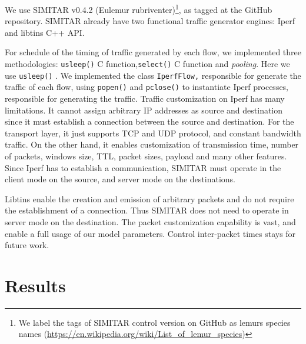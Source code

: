 We use SIMITAR v0.4.2 (Eulemur rubriventer)\footnote{ We label the tags of SIMITAR control version on GitHub as lemurs species names (\href{https://en.wikipedia.org/wiki/List_of_lemur_species}{https://en.wikipedia.org/wiki/List\_of\_lemur\_species})}, as tagged at the GitHub repository.  SIMITAR already have two functional traffic generator engines: Iperf and libtins C++ API.  

For schedule of the timing of traffic generated by each flow, we implemented three methodologies: \texttt{usleep()} C function,\texttt{select()} C function and \textit{pooling}. Here we use \texttt{usleep()} . We implemented the class \texttt{IperfFlow,} responsible for generate the traffic of each flow, using \texttt{popen()} and \texttt{pclose()} to instantiate Iperf processes, responsible for generating the traffic. Traffic customization on Iperf has many limitations. It cannot assign arbitrary IP addresses as source and destination since it must establish a connection between the source and destination. For the transport layer, it just supports TCP and UDP protocol, and constant bandwidth traffic. On the other hand, it enables customization of transmission time, number of packets, windows size, TTL, packet sizes, payload and many other features. Since Iperf has to establish a communication, SIMITAR must operate in the client mode on the source, and server mode on the destinations.

Libtins enable the creation and emission of arbitrary packets and do not require the establishment of a connection.  Thus SIMITAR does not need to operate in server mode on the destination. The packet customization capability is vast, and enable a full usage of our model parameters. Control inter-packet times stays for future work. 



\section{Results}


